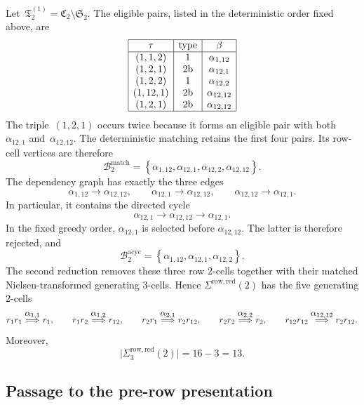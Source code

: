 \documentclass[a4paper, twoside, 11pt, english]{article}
\begin{document}
Let~$\mathfrak T_2^{(1)}=\mathfrak C_2\setminus\mathfrak S_2$.
The eligible pairs, listed in the deterministic order fixed above, are
\[
\begin{array}{|c|c|c|}
\hline
\tau & \text{type} & \beta \\ \hline
(1,1,2)  & 1             & \alpha_{1,12}\\
(1,2,1)  & 2\mathrm b    & \alpha_{12,1}\\
(1,2,2)  & 1             & \alpha_{12,2}\\
(1,12,1) & 2\mathrm b    & \alpha_{12,12}\\
(1,2,1)  & 2\mathrm b    & \alpha_{12,12}\\ \hline
\end{array}
\]
The triple~$(1,2,1)$ occurs twice because it forms an eligible pair
with both~$\alpha_{12,1}$ and~$\alpha_{12,12}$.
The deterministic matching retains the first four pairs. Its row-cell
vertices are therefore
\[
\mathcal B_2^{\mathrm{match}}
=
\left\{
\alpha_{1,12},
\alpha_{12,1},
\alpha_{12,2},
\alpha_{12,12}
\right\}.
\]
The dependency graph has exactly the three edges
\[
\alpha_{1,12}\longrightarrow\alpha_{12,12},
\qquad
\alpha_{12,1}\longrightarrow\alpha_{12,12},
\qquad
\alpha_{12,12}\longrightarrow\alpha_{12,1}.
\]
In particular, it contains the directed cycle
\[
\alpha_{12,1}
\longrightarrow
\alpha_{12,12}
\longrightarrow
\alpha_{12,1}.
\]
In the fixed greedy order, $\alpha_{12,1}$ is selected before
$\alpha_{12,12}$. The latter is therefore rejected, and
\[
\mathcal B_2^{\mathrm{acyc}}
=
\left\{
\alpha_{1,12},
\alpha_{12,1},
\alpha_{12,2}
\right\}.
\]
The second reduction removes these three row $2$-cells together with
their matched Nielsen-transformed generating $3$-cells. Hence
$\Sigma^{\mathrm{row,red}}(2)$ has the five generating $2$-cells
\[
r_1r_1\overset{\displaystyle \alpha_{1,1}}{\Longrightarrow}r_1,
\qquad
r_1r_2\overset{\displaystyle \alpha_{1,2}}{\Longrightarrow}r_{12},
\qquad
r_2r_1\overset{\displaystyle \alpha_{2,1}}{\Longrightarrow}r_2r_{12},
\qquad
r_2r_2\overset{\displaystyle \alpha_{2,2}}{\Longrightarrow}r_2,
\qquad
r_{12}r_{12}
\overset{\displaystyle \alpha_{12,12}}{\Longrightarrow}
r_2r_{12}.
\]
Moreover,
\[
\bigl|\Sigma^{\mathrm{row,red}}_3(2)\bigr|
=
16-3
=
13.
\]

\subsection{Passage to the pre-row presentation}
\end{document}
